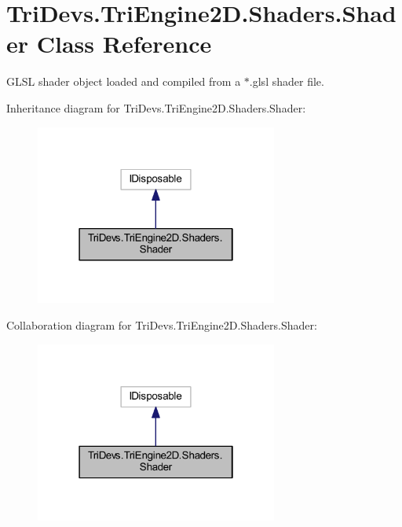 \hypertarget{class_tri_devs_1_1_tri_engine2_d_1_1_shaders_1_1_shader}{\section{Tri\-Devs.\-Tri\-Engine2\-D.\-Shaders.\-Shader Class Reference}
\label{class_tri_devs_1_1_tri_engine2_d_1_1_shaders_1_1_shader}
}


G\-L\-S\-L shader object loaded and compiled from a $\ast$.glsl shader file.  




Inheritance diagram for Tri\-Devs.\-Tri\-Engine2\-D.\-Shaders.\-Shader\-:
\nopagebreak
\begin{figure}[H]
\begin{center}
\leavevmode
\includegraphics[width=226pt]{class_tri_devs_1_1_tri_engine2_d_1_1_shaders_1_1_shader__inherit__graph}
\end{center}
\end{figure}


Collaboration diagram for Tri\-Devs.\-Tri\-Engine2\-D.\-Shaders.\-Shader\-:
\nopagebreak
\begin{figure}[H]
\begin{center}
\leavevmode
\includegraphics[width=226pt]{class_tri_devs_1_1_tri_engine2_d_1_1_shaders_1_1_shader__coll__graph}
\end{center}
\end{figure}
